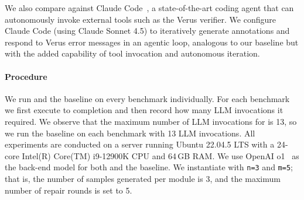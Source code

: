 We also compare against Claude Code~\cite{claudecode}, a state-of-the-art coding agent that can autonomously invoke external tools such as the Verus verifier. We configure Claude Code (using Claude Sonnet 4.5) to iteratively generate annotations and respond to Verus error messages in an agentic loop, analogous to our baseline but with the added capability of tool invocation and autonomous iteration.




\paragraph{Procedure}
We run \toolname{} and the baseline on every benchmark individually. For each benchmark we first execute \toolname{} to completion and then record how many LLM invocations it required. We observe that the maximum number of LLM invocations for \toolname{} is 13, so we run the baseline on each benchmark with 13 LLM invocations. All experiments are conducted on a server running Ubuntu 22.04.5 LTS with a 24-core Intel(R) Core(TM) i9-12900K CPU and 64\,GB RAM.  We use OpenAI o1~\cite{o1} as the  back-end model for both \toolname{} and the baseline.
We instantiate \toolname{} with \texttt{n=3} and \texttt{m=5}; that is, the number of samples generated per module is 3, and the maximum number of repair rounds is set to 5. 



